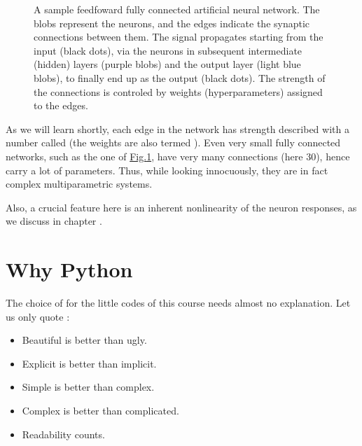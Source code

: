 \documentclass[letterpaper,10pt,english]{jupyterBook}
\let\sphinxpxdimen\pdfpxdimen\else\newdimen\sphinxpxdimen
\begin{document}
\begin{figure}[htbp]
\centering
\capstart

\noindent\sphinxincludegraphics[width=300\sphinxpxdimen]{{feed_f}.png}
\caption{A sample feed\sphinxhyphen{}foward fully connected artificial neural network. The blobs represent the neurons, and the edges indicate the synaptic connections between them. The signal propagates starting from the input (black dots), via the neurons in subsequent intermediate (hidden) layers (purple blobs) and the output layer (light blue blobs), to finally end up as the output (black dots). The strength of the connections is controled by weights (hyperparameters) assigned to the edges.}\label{\detokenize{docs/intro:ffnn-fig}}\end{figure}

\sphinxAtStartPar
As we will learn shortly, each edge in the network has strength described with a number called  (the weights are also termed ). Even very small fully connected networks, such as the one of \hyperref[\detokenize{docs/intro:ffnn-fig}]{Fig.\@ \ref{\detokenize{docs/intro:ffnn-fig}}}, have very many connections (here 30), hence carry a lot of parameters. Thus, while looking innocuously, they are in fact complex multi\sphinxhyphen{}parametric systems.

\sphinxAtStartPar
Also, a crucial feature here is an inherent nonlinearity of the neuron responses, as we discuss in chapter {\hyperref[\detokenize{docs/mcp:mcp-lab}]{}}.


\section{Why Python}
\label{\detokenize{docs/intro:why-python}}
\sphinxAtStartPar
The choice of   for the little codes of this course needs almost no explanation. Let us only quote :
\begin{itemize}
\item {} 
\sphinxAtStartPar
Beautiful is better than ugly.

\item {} 
\sphinxAtStartPar
Explicit is better than implicit.

\item {} 
\sphinxAtStartPar
Simple is better than complex.

\item {} 
\sphinxAtStartPar
Complex is better than complicated.

\item {} 
\sphinxAtStartPar
Readability counts.

\end{itemize}
\end{document}
